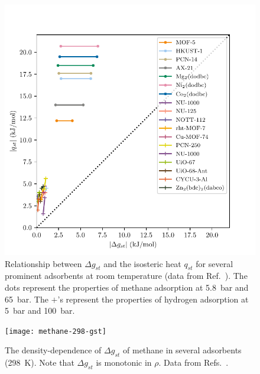 \documentclass[twoside,twocolumn,9pt]{article}
\newcommand\gst{\ensuremath{\Delta g_{st}}}
\begin{document}
\begin{figure}
    \centering
    \includegraphics[width=0.95\columnwidth]{qst-vs-delta-G}
    \caption{Relationship between $\gst$ and the isosteric heat
      $q_{st}$ for several prominent adsorbents at room
      temperature (data from Ref.~\cite{mason2014evaluating, garcia2018benchmark}). The dots represent the properties of methane
      adsorption at 5.8~bar and 65~bar. The $+$'s represent the
      properties of hydrogen adsorption at 5~bar and
      100~bar.}
    \label{fig:qst-vs-delta-G}
\end{figure}

\begin{figure}
    \centering
    \texttt{[image: methane-298-gst]}
    \caption{The density-dependence of $\gst$ of methane in several
      adsorbents (298\ K). Note that $\gst$ is monotonic in
      $\rho$. Data from
      Refs.~\cite{mason2014evaluating, furukawa2009storage}.
    }
    \label{fig:methane-gst}
\end{figure}
\end{document}
